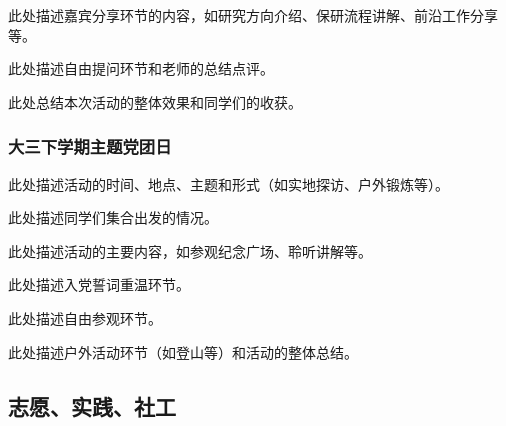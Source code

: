此处描述嘉宾分享环节的内容，如研究方向介绍、保研流程讲解、前沿工作分享等。


此处描述自由提问环节和老师的总结点评。


此处总结本次活动的整体效果和同学们的收获。

\subsubsection{大三下学期主题党团日}

此处描述活动的时间、地点、主题和形式（如实地探访、户外锻炼等）。

此处描述同学们集合出发的情况。

此处描述活动的主要内容，如参观纪念广场、聆听讲解等。

此处描述入党誓词重温环节。


此处描述自由参观环节。


此处描述户外活动环节（如登山等）和活动的整体总结。


\subsection{志愿、实践、社工}

